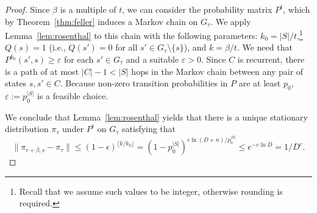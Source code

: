 \documentclass[11pt]{article}
\begin{document}
\begin{proof}
	Since $\beta$ is a multiple of $t$, we can consider the probability matrix $P^t$, which by Theorem~\ref{thm:feller} induces a Markov chain on $G_{\tau}$. We apply Lemma~\ref{lem:rosenthal} to this chain with the following parameters: $k_0 = |S|/t$,\footnote{Recall that we assume such values to be integer, otherwise rounding is required.} $Q(s) = 1$ (i.e., $Q(s')=0$ for all $s'\in G_{\tau}\setminus \{s\}$), and $k = \beta/t$. We need that $P^{k_0}(s',s)\geq \varepsilon$ for each $s'\in G_{\tau}$ and a suitable $\varepsilon>0$. Since $C$ is recurrent, there is a path of at most $|C|-1<|S|$ hops in the Markov chain between any pair of states $s,s'\in C$. Because non-zero transition probabilities in $P$ are at least $p_0$, $\varepsilon:=p_0^{|S|}$ is a feasible choice.
	
	We conclude that Lemma~\ref{lem:rosenthal} yields that there is a unique stationary distribution $\pi_{\tau}$ under $P^t$ on $G_{\tau}$ satisfying that 
	\begin{equation*}
	\|\pi_{r+\beta,s} - \pi_{\tau}\| \leq (1-\epsilon)^{\lfloor k/k_0\rfloor} = \left(1-p_0^{|S|}\right)^{c \ln(D+n) / p_0^{|S|}} \leq e^{-c \ln D} = 1/D^c.
	\end{equation*}
\end{proof}
\end{document}
